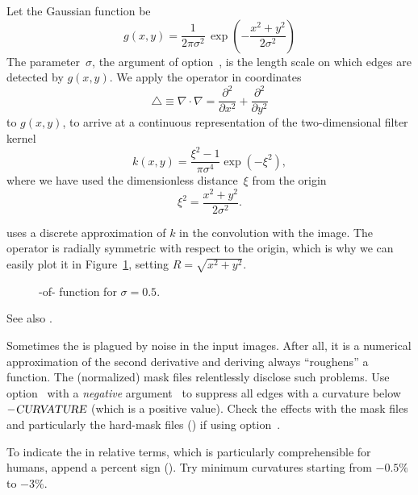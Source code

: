 Let the Gaussian function be
\[
    g(x, y) =
    \frac{1}{2 \pi \sigma^2} \,
    {\exp\left(-\frac{x^2 + y^2}{2 \sigma^2}\right)}
\]
\noindent The parameter~$\sigma$, the argument of
option~, is the length scale on which
edges are detected by $g(x, y)$.  We apply the 
operator in  coordinates
\[
    \bigtriangleup \equiv \nabla \cdot \nabla =
    \frac{\partial^2}{\partial x^2} + \frac{\partial^2}{\partial y^2}
\]
\noindent to $g(x, y)$, to arrive at a continuous representation of the
two-dimensional filter kernel
\[
    k(x, y) = \frac{\xi^2 - 1}{\pi \sigma^4} \exp(-\xi^2),
\]
\noindent where we have used the dimensionless distance~$\xi$ from the
origin
\[
    \xi^2 = \frac{x^2 + y^2}{2 \sigma^2}.
\]

\App{} uses a discrete approximation of $k$ in the convolution with
the image.  The operator is radially symmetric with respect to the
origin, which is why we can easily plot it in
Figure~\ref{fig:laplacian-of-gaussian}, setting $R = \sqrt{x^2 +
  y^2}$.


\begin{figure}[htbp]
  \ifreferencemanual\begin{maxipage}\fi
  \centering
  \ifreferencemanual\end{maxipage}\fi

  \caption[-of-]%
          {-of- function
            for $\sigma = 0.5$.\label{fig:laplacian-of-gaussian}}
\end{figure}


\noindent See also .

Sometimes the  is plagued by noise in the input images.
After all, it is a numerical approximation of the second derivative
and deriving always ``roughens'' a function.  The (normalized) mask
files relentlessly disclose such problems.  Use
option~ with a \emph{negative}
argument~ to suppress all edges with a curvature
below $-\textsl{CURVATURE}$ (which is a positive value).  Check the
effects with the mask files and particularly the hard-mask files
() if using
option~.

To indicate the  in relative terms, which is
particularly comprehensible for humans, append a percent sign
(\sample{\%}).  Try minimum curvatures starting from $-0.5\%$ to
$-3\%$.

